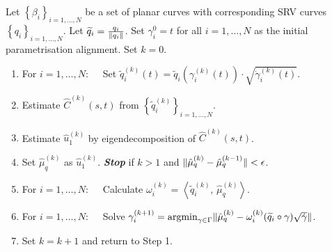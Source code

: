\begin{algorithm}
  \label{algo:mean}
  Let $\left\{\beta_i\right\}_{i=1,\dots,N}$ be a set of planar curves with corresponding SRV curves $\left\{ q_i \right\}_{i=1,\dots,N}$.
  Let $\widetilde q_i = \frac{q_i}{\lVert q_i\rVert}$.
  Set $\gamma_i^0 = t$ for all $i=1,\dots,N$ as the initial parametrisation alignment.
  Set $k = 0$. 
  \begin{enumerate}
    \item For $i=1,\dots,N: \quad$ Set $\widetilde q_i^{(k)}(t) = \widetilde q_i\left(\gamma^{(k)}_i(t)\right) \cdot \sqrt{\dot\gamma_i^{(k)}(t)}$.
    \item Estimate $\hat C^{(k)}(s,t)$ from $\left\{\widetilde q_i^{(k)}\right\}_{i=1,\dots,N}$. 
    \item Estimate $\hat u_1^{(k)}$ by eigendecomposition of $\hat C^{(k)}(s,t)$.
    \item Set $\hat\mu_q^{(k)}$ as $\hat u_1^{(k)}$. \emph{\textbf{Stop}} if $k>1$ and $\lVert\hat\mu_q^{(k)} - \hat\mu_q^{(k-1)}\rVert < \epsilon$.
    \item For $i=1,\dots,N:\quad$ Calculate $\omega^{(k)}_i = \left\langle \widetilde q_i^{(k)},\, \hat\mu_q^{(k)} \right\rangle$.
    \item For $i=1,\dots,N:\quad$ Solve $\gamma_i^{(k+1)} = \operatorname*{argmin}_{\gamma \in \Gamma} \lVert\hat\mu_q^{(k)} - \omega_i^{(k)} (\widetilde q_i \circ \gamma ) \sqrt{\dot\gamma}\rVert$.
    \item Set $k = k+1$ and return to Step 1.
  \end{enumerate}
\end{algorithm}

